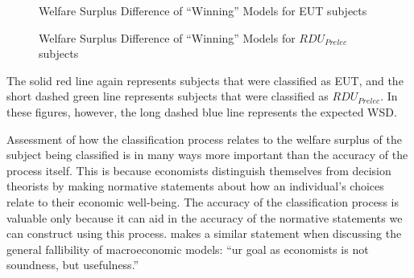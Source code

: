 \documentclass[../main.tex]{subfiles}
\begin{document}
\begin{figure}[hb!]
	\center
	\caption{Welfare Surplus Difference of \enquote{Winning} Models for EUT subjects}
	\label{fig:HN1_wel_eut}
\end{figure}

\begin{figure}[ht!]
	\center
	\caption{Welfare Surplus Difference of \enquote{Winning} Models for $\mathit{RDU_{Prelec}}$ subjects}
	\label{fig:HN1_wel_pre}
\end{figure}

The solid red line again represents subjects that were classified as EUT, and the short dashed green line represents subjects that were classified as $\mathit{RDU_{Prelec}}$.
In these figures, however, the long dashed blue line represents the expected WSD.

Assessment of how the classification process relates to the welfare surplus of the subject being classified is in many ways more important than the accuracy of the process itself.
This is because economists distinguish themselves from decision theorists by making normative statements about how an individual's choices relate to their economic well-being.
The accuracy of the classification process is valuable only because it can aid in the accuracy of the normative statements we can construct using this process.
\textcite[25]{Leamer2012} makes a similar statement when discussing the general fallibility of macroeconomic models: \enquote{ur goal as economists is not soundness, but usefulness.}
\end{document}
